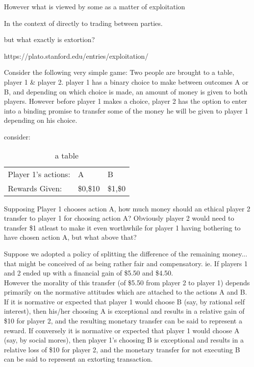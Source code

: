 However what is viewed by some as a matter of exploitation

In the context of directly to trading between parties.

but what exactly is extortion? 

https://plato.stanford.edu/entries/exploitation/


Consider the following very simple game: Two people are brought to a table, player 1 \& player 2. player 1 has a binary choice to make between outcomes A or B, and depending on which choice is made, an amount of money is given to both players.
However before player 1 makes a choice, player 2 has the option to enter into a binding promise to transfer some of the money he will be given to player 1 depending on his choice.

consider:

\begin{table}[h!]
\begin{tabular}{lll}
Player 1's actions: & A   & B   \\
Rewards Given:      & \$0,\$10 & \$1,\$0
\end{tabular}
\caption{a table}
\end{table}

Supposing Player 1 chooses action A, how much money should an ethical player 2 transfer to player 1 for choosing action A?
Obviously player 2 would need to transfer \$1 atleast to make it even worthwhile for player 1 having bothering to have chosen action A, but what above that?

Suppose we adopted a policy of splitting the difference of the remaining money... that might be conceived of as being rather fair and compensatory. ie. If players 1 and 2 ended up with a financial gain of \$5.50 and \$4.50.\\

However the morality of this transfer (of \$5.50 from player 2 to player 1) depends primarily on the normative attitudes which are attached to the actions A and B.\\

If it is normative or expected that player 1 would choose B (say, by rational self interest), then his/her choosing A is exceptional and results in a relative gain of \$10 for player 2, and the resulting monetary transfer can be said to represent a reward.
If conversely it is normative or expected that player 1 would choose A (say, by social mores), then player 1's choosing B is exceptional and results in a relative loss of \$10 for player 2, and the monetary transfer for not executing B can be said to represent an extorting transaction.

